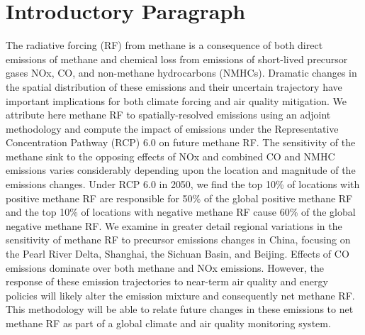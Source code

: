 \section*{Introductory Paragraph}

The radiative forcing (RF) from methane is a consequence of both direct emissions of methane and chemical loss from emissions of short-lived precursor gases NOx, CO, and non-methane hydrocarbons (NMHCs). Dramatic changes in the spatial distribution of these emissions and their uncertain trajectory have important implications for both climate forcing and air quality mitigation.  We attribute here methane RF to spatially-resolved emissions using an adjoint methodology and compute the impact of emissions under the Representative Concentration Pathway (RCP) 6.0 on future methane RF. The sensitivity of the methane sink to the opposing effects of NOx and combined CO and NMHC emissions varies considerably depending upon the location and magnitude of the emissions changes. Under RCP 6.0 in 2050, we find the top 10\% of locations with positive methane RF are responsible for 50\% of the global positive methane RF and the top 10\% of locations with negative methane RF cause 60\% of the global negative methane RF. We examine in greater detail regional variations in the sensitivity of methane RF to precursor emissions changes in China, focusing on the Pearl River Delta, Shanghai, the Sichuan Basin, and Beijing. Effects of CO emissions dominate over both methane and NOx emissions. However, the response of these emission trajectories to near-term air quality and energy policies will likely alter the emission mixture and consequently net methane RF. This methodology will be able to relate future changes in these emissions to net methane RF as part of a global climate and air quality monitoring system. 